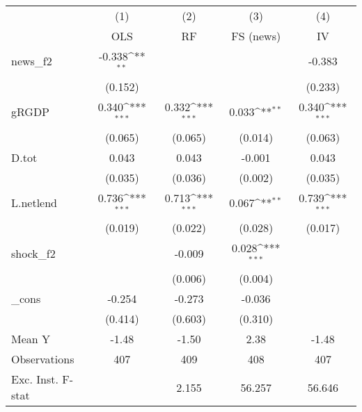 {
\def\sym#1{\ifmmode^{#1}\else\(^{#1}\)\fi}
\begin{tabular}{l*{4}{c}}
\toprule
            &\multicolumn{1}{c}{(1)}&\multicolumn{1}{c}{(2)}&\multicolumn{1}{c}{(3)}&\multicolumn{1}{c}{(4)}\\
            &\multicolumn{1}{c}{OLS}&\multicolumn{1}{c}{RF}&\multicolumn{1}{c}{FS (news)}&\multicolumn{1}{c}{IV}\\
\midrule
news\_f2     &      -0.338\sym{**} &                     &                     &      -0.383         \\
            &     (0.152)         &                     &                     &     (0.233)         \\
\addlinespace
gRGDP       &       0.340\sym{***}&       0.332\sym{***}&       0.033\sym{**} &       0.340\sym{***}\\
            &     (0.065)         &     (0.065)         &     (0.014)         &     (0.063)         \\
\addlinespace
D.tot       &       0.043         &       0.043         &      -0.001         &       0.043         \\
            &     (0.035)         &     (0.036)         &     (0.002)         &     (0.035)         \\
\addlinespace
L.netlend   &       0.736\sym{***}&       0.713\sym{***}&       0.067\sym{**} &       0.739\sym{***}\\
            &     (0.019)         &     (0.022)         &     (0.028)         &     (0.017)         \\
\addlinespace
shock\_f2    &                     &      -0.009         &       0.028\sym{***}&                     \\
            &                     &     (0.006)         &     (0.004)         &                     \\
\addlinespace
\_cons      &      -0.254         &      -0.273         &      -0.036         &                     \\
            &     (0.414)         &     (0.603)         &     (0.310)         &                     \\
\midrule
Mean Y      &       -1.48         &       -1.50         &        2.38         &       -1.48         \\
Observations&         407         &         409         &         408         &         407         \\
Exc. Inst. F-stat&                     &       2.155         &      56.257         &      56.646         \\
\bottomrule
\end{tabular}
}
